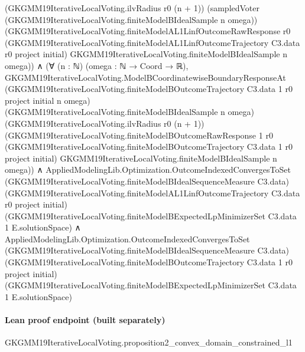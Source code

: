 \documentclass[10pt]{article}
\begin{document}
\begin{ReviewVerbatim}
                (GKGMM19IterativeLocalVoting.ilvRadius r0 (n + 1))
                (sampledVoter (GKGMM19IterativeLocalVoting.finiteModelBIdealSample n omega))
                (GKGMM19IterativeLocalVoting.finiteModelAL1LinfOutcomeRawResponse r0
                  (GKGMM19IterativeLocalVoting.finiteModelAL1LinfOutcomeTrajectory C3.data r0 project initial)
                  GKGMM19IterativeLocalVoting.finiteModelBIdealSample n omega)) ∧
      (∀ (n : ℕ) (omega : ℕ → Coord → ℝ),
          GKGMM19IterativeLocalVoting.ModelBCoordinatewiseBoundaryResponseAt
            (GKGMM19IterativeLocalVoting.finiteModelBOutcomeTrajectory C3.data 1 r0 project initial n omega)
            (GKGMM19IterativeLocalVoting.finiteModelBIdealSample n omega)
            (GKGMM19IterativeLocalVoting.ilvRadius r0 (n + 1))
            (GKGMM19IterativeLocalVoting.finiteModelBOutcomeRawResponse 1 r0
              (GKGMM19IterativeLocalVoting.finiteModelBOutcomeTrajectory C3.data 1 r0 project initial)
              GKGMM19IterativeLocalVoting.finiteModelBIdealSample n omega)) ∧
        AppliedModelingLib.Optimization.OutcomeIndexedConvergesToSet
            (GKGMM19IterativeLocalVoting.finiteModelBIdealSequenceMeasure C3.data)
            (GKGMM19IterativeLocalVoting.finiteModelAL1LinfOutcomeTrajectory C3.data r0 project initial)
            (GKGMM19IterativeLocalVoting.finiteModelBExpectedLpMinimizerSet C3.data 1 E.solutionSpace) ∧
          AppliedModelingLib.Optimization.OutcomeIndexedConvergesToSet
            (GKGMM19IterativeLocalVoting.finiteModelBIdealSequenceMeasure C3.data)
            (GKGMM19IterativeLocalVoting.finiteModelBOutcomeTrajectory C3.data 1 r0 project initial)
            (GKGMM19IterativeLocalVoting.finiteModelBExpectedLpMinimizerSet C3.data 1 E.solutionSpace)
\end{ReviewVerbatim}

\paragraph{Lean proof endpoint (built separately)}\begin{ReviewVerbatim}
GKGMM19IterativeLocalVoting.proposition2_convex_domain_constrained_l1
\end{ReviewVerbatim}
\end{document}

